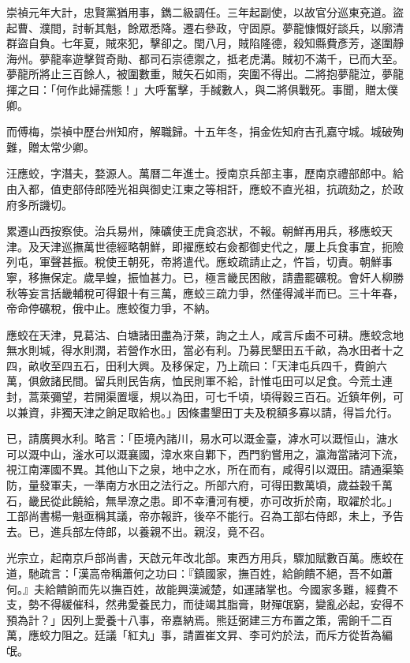 \begin{pinyinscope}
崇禎元年大計，忠賢黨猶用事，鐫二級調任。三年起副使，以故官分巡東兗道。盜起曹、濮間，討斬其魁，餘眾悉降。遷右參政，守固原。夢龍慷慨好談兵，以廓清群盜自負。七年夏，賊來犯，擊卻之。閏八月，賊陷隆德，殺知縣費彥芳，遂圍靜海州。夢龍率遊擊賀奇勛、都司石崇德禦之，抵老虎溝。賊初不滿千，已而大至。夢龍所將止三百餘人，被圍數重，賊矢石如雨，突圍不得出。二將抱夢龍泣，夢龍揮之曰：「何作此婦孺態！」大呼奮擊，手馘數人，與二將俱戰死。事聞，贈太僕卿。

而傅梅，崇禎中歷台州知府，解職歸。十五年冬，捐金佐知府吉孔嘉守城。城破殉難，贈太常少卿。

汪應蛟，字潛夫，婺源人。萬曆二年進士。授南京兵部主事，歷南京禮部郎中。給由入都，值吏部侍郎陸光祖與御史江東之等相訐，應蛟不直光祖，抗疏劾之，於政府多所譏切。

累遷山西按察使。治兵易州，陳礦使王虎貪恣狀，不報。朝鮮再用兵，移應蛟天津。及天津巡撫萬世德經略朝鮮，即擢應蛟右僉都御史代之，屢上兵食事宜，扼險列屯，軍聲甚振。稅使王朝死，帝將遣代。應蛟疏請止之，忤旨，切責。朝鮮事寧，移撫保定。歲旱蝗，振恤甚力。已，極言畿民困敝，請盡罷礦稅。會奸人柳勝秋等妄言括畿輔稅可得銀十有三萬，應蛟三疏力爭，然僅得減半而已。三十年春，帝命停礦稅，俄中止。應蛟復力爭，不納。

應蛟在天津，見葛沽、白塘諸田盡為汙萊，詢之土人，咸言斥鹵不可耕。應蛟念地無水則堿，得水則潤，若營作水田，當必有利。乃募民墾田五千畝，為水田者十之四，畝收至四五石，田利大興。及移保定，乃上疏曰：「天津屯兵四千，費餉六萬，俱斂諸民間。留兵則民告病，恤民則軍不給，計惟屯田可以足食。今荒土連封，蒿萊彌望，若開渠置堰，規以為田，可七千頃，頃得穀三百石。近鎮年例，可以兼資，非獨天津之餉足取給也。」因條畫墾田丁夫及稅額多寡以請，得旨允行。

已，請廣興水利。略言：「臣境內諸川，易水可以溉金臺，滹水可以溉恒山，溏水可以溉中山，滏水可以溉襄國，漳水來自鄴下，西門豹嘗用之，瀛海當諸河下流，視江南澤國不異。其他山下之泉，地中之水，所在而有，咸得引以溉田。請通渠築防，量發軍夫，一準南方水田之法行之。所部六府，可得田數萬頃，歲益穀千萬石，畿民從此饒給，無旱潦之患。即不幸漕河有梗，亦可改折於南，取糴於北。」工部尚書楊一魁亟稱其議，帝亦報許，後卒不能行。召為工部右侍郎，未上，予告去。已，進兵部左侍郎，以養親不出。親沒，竟不召。

光宗立，起南京戶部尚書，天啟元年改北部。東西方用兵，驟加賦數百萬。應蛟在道，馳疏言：「漢高帝稱蕭何之功曰：『鎮國家，撫百姓，給餉饋不絕，吾不如蕭何。』夫給饋餉而先以撫百姓，故能興漢滅楚，如運諸掌也。今國家多難，經費不支，勢不得緩催科，然弗愛養民力，而徒竭其脂膏，財殫氓窮，變亂必起，安得不預為計？」因列上愛養十八事，帝嘉納焉。熊廷弼建三方布置之策，需餉千二百萬，應蛟力阻之。廷議「紅丸」事，請置崔文昇、李可灼於法，而斥方從哲為編氓。


\end{pinyinscope}
